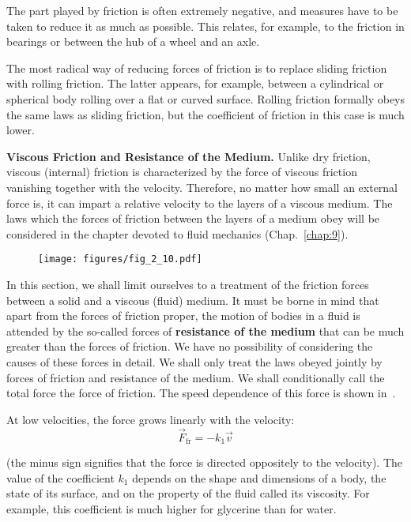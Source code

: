 The part played by friction is often extremely negative, and measures have to be taken to reduce it as much as possible. This relates, for example, to the friction in bearings or between the hub of a wheel and an axle.

The most radical way of reducing forces of friction is to replace sliding friction with rolling friction. The latter appears, for example, between a cylindrical or spherical body rolling over a flat or curved surface. Rolling friction formally obeys the same laws as sliding friction, but the coefficient of friction in this case is much lower.

\textbf{Viscous Friction and Resistance of the Medium.} Unlike dry friction, viscous (internal) friction is characterized by the force of viscous friction vanishing together with the velocity. Therefore, no matter how small an external force is, it can impart a relative velocity to the layers of a viscous medium. The laws which the forces of friction between the layers of a medium obey will be considered in the chapter devoted to fluid mechanics (Chap.~\ref{chap:9}). 

\begin{figure}[t]
	\begin{center}
		\texttt{[image: figures/fig\_2\_10.pdf]}
		\caption[]{}
		\label{fig:2_10}
	\end{center}
	\vspace{-0.7cm}
\end{figure}

In this section, we shall limit ourselves to a treatment of the friction forces between a solid and a viscous (fluid) medium. It must be borne in mind that apart from the forces of friction proper, the motion of bodies in a fluid is attended by the so-called forces of \textbf{resistance of the medium} that can be much greater than the forces of friction. We have no possibility of considering the causes of these forces in detail. We shall only treat the laws obeyed jointly by forces of friction and resistance of the medium. We shall conditionally call the total force the force of friction. The speed dependence of this force is shown in~.

At low velocities, the force grows linearly with the velocity:
\begin{equation}\label{eq:2_36}
\vec{F}_{\text{fr}} = -k_1 \vec{v}
\end{equation}

\noindent
(the minus sign signifies that the force is directed oppositely to the velocity). The value of the coefficient $k_1$ depends on the shape and dimensions of a body, the state of its surface, and on the property of the fluid called its viscosity. For example, this coefficient is much higher for glycerine than for water.

